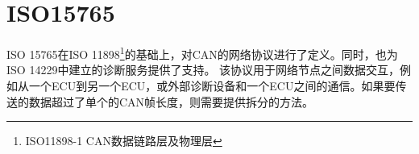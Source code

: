 \section{ISO15765}
ISO 15765在ISO 11898\footnote{ISO11898-1 CAN数据链路层及物理层}的基础上，对CAN的网络协议进行了定义。同时，也为ISO 14229中建立的诊断服务提供了支持。
该协议用于网络节点之间数据交互，例如从一个ECU到另一个ECU，或外部诊断设备和一个ECU之间的通信。如果要传送的数据超过了单个的CAN帧长度，则需要提供拆分的方法。

